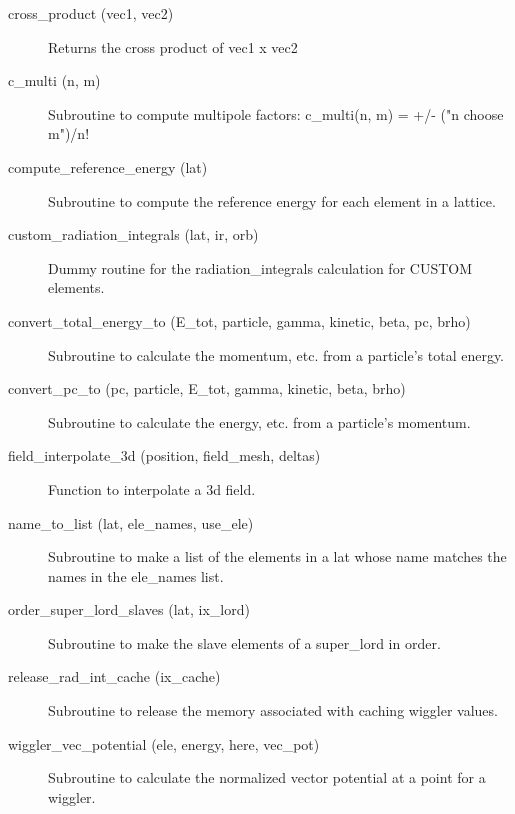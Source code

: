 \begin{description}

\item[cross_product (vec1, vec2)] \Newline 
Returns the cross product of vec1 x vec2

\item[c_multi (n, m)] \Newline
Subroutine to compute multipole factors: 
c_multi(n, m) = +/- ("n choose m")/n! 

\item[compute_reference_energy (lat)] \Newline
Subroutine to compute the reference energy for each element in a lattice. 

\item[custom_radiation_integrals (lat, ir, orb)] \Newline
Dummy routine for the radiation_integrals calculation for CUSTOM elements. 

\item[convert_total_energy_to (E_tot, particle, gamma, kinetic, beta, pc, brho)] \Newline
Subroutine to calculate the momentum, etc. from a particle's total energy. 

\item[convert_pc_to (pc, particle, E_tot, gamma, kinetic, beta, brho)] \Newline
Subroutine to calculate the energy, etc. from a particle's momentum. 

\item[field_interpolate_3d (position, field_mesh, deltas)] \Newline
Function to interpolate a 3d field. 

\item[name_to_list (lat, ele_names, use_ele)] \Newline
Subroutine to make a list of the elements in a lat 
whose name matches the names in the ele_names list. 

\item[order_super_lord_slaves (lat, ix_lord)] \Newline
Subroutine to make the slave elements of a super_lord in order. 

\item[release_rad_int_cache (ix_cache)] \Newline 
     Subroutine to release the memory associated with caching wiggler values.

\item[wiggler_vec_potential (ele, energy, here, vec_pot)] \Newline
Subroutine to calculate the normalized vector potential at a point for a wiggler.

\end{description}

